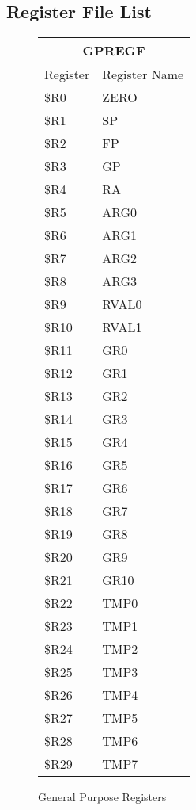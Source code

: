 \documentclass[letterpaper, 11pt]{article}
\begin{document}
\subsection{Register File List}
\begin{figure}[!h]
	\caption{General Purpose Registers}
	\parbox{0.5\linewidth}{
		\centering
		\fontsize{6}{8}\selectfont
		\begin{tabular}{|l|l|}
			\hline
			\multicolumn{2}{|c|}{GPREGF} \\
			\hline
			Register & Register Name \\ \hline
			\$R0  & ZERO \\ 	\hline
			\$R1  & SP \\ 	\hline
			\$R2  & FP \\ 	\hline
			\$R3  & GP \\ 	\hline
			\$R4  & RA \\ 	\hline
			\$R5  & ARG0 \\ 	\hline
			\$R6  & ARG1 \\ 	\hline
			\$R7  & ARG2 \\ 	\hline
			\$R8  & ARG3 \\ 	\hline
			\$R9  & RVAL0 \\ 	\hline
			\$R10 & RVAL1 \\ \hline
			\$R11 & GR0  \\ \hline
			\$R12 & GR1  \\ \hline
			\$R13 & GR2  \\ \hline
			\$R14 & GR3  \\ \hline
			\$R15 & GR4  \\ \hline
			\$R16 & GR5  \\ \hline
			\$R17 & GR6  \\ \hline
			\$R18 & GR7  \\ \hline
			\$R19 & GR8  \\ \hline
			\$R20 & GR9  \\ \hline
			\$R21 & GR10  \\ \hline
			\$R22 & TMP0  \\ \hline
			\$R23 & TMP1 \\ \hline
			\$R24 & TMP2  \\ \hline
			\$R25 & TMP3  \\ \hline
			\$R26 & TMP4  \\ \hline
			\$R27 & TMP5  \\ \hline
			\$R28 & TMP6  \\ \hline
			\$R29 & TMP7  \\ \hline

\end{tabular}}
\end{figure}
\end{document}
